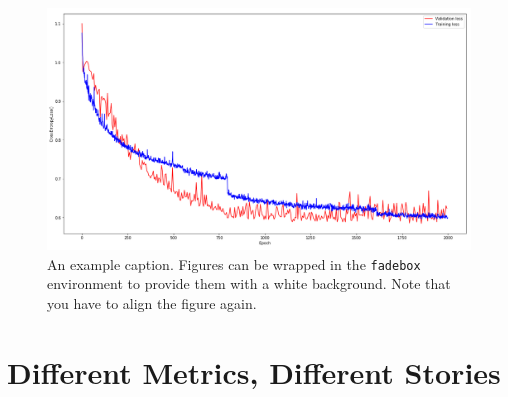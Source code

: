 \documentclass[
]{dtuposter}
\begin{document}
\begin{dtupostercontent}
\begin{figure}
	\begin{fadebox}\begin{center}
			\includegraphics[width=\linewidth,origin=c]{loss}
	\end{center}\end{fadebox}
	\caption{An example caption. Figures can be wrapped in the \texttt{fadebox} 
		environment to provide them with a white background. Note that you have to align the 
		figure again.}\label{fig:example2}
\end{figure}


\section{Different Metrics, Different Stories}







\end{dtupostercontent}
\end{document}
